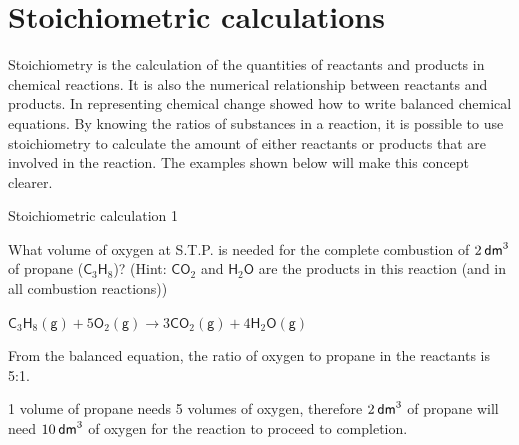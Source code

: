             \section{Stoichiometric calculations}
            \nopagebreak
      \label{m38712*id283990}Stoichiometry is the calculation of the quantities of reactants and products in chemical reactions. It is also the numerical relationship between reactants and products. In  representing chemical change showed how to write balanced chemical equations. By knowing the ratios of substances in a reaction, it is possible to use stoichiometry to calculate the amount of either reactants or products that are involved in the reaction. The examples shown below will make this concept clearer.\par 
\label{m38712*secfhsst!!!underscore!!!id1903}\vspace{.5cm}  
      \begin{wex}{Stoichiometric calculation 1 }
{

      \label{m38712*probfhsst!!!underscore!!!id1904}
      \label{m38712*id275479}What volume of oxygen at S.T.P. is needed for the complete combustion of $2\phantom{\rule{2pt}{0ex}}{\mathsf{dm}}^{3}$ of propane ($\mathsf{C}{}_{3}\mathsf{H}{}_{8}$)? (Hint: $\mathsf{CO}{}_{2}$ and $\mathsf{H}{}_{2}\mathsf{O}$ are the products in this reaction (and in all combustion reactions))\par 
      \vspace{5pt}}
{
      \label{m38712*id284189}${\mathsf{C}}_{3}{\mathsf{H}}_{8}\left(\mathsf{g}\right)+5{\mathsf{O}}_{2}\left(\mathsf{g}\right)\to 3\mathsf{C}{\mathsf{O}}_{2}\left(\mathsf{g}\right)+4{\mathsf{H}}_{2}\mathsf{O}\left(\mathsf{g}\right)$
      \par 
      \label{m38712*id284294}From the balanced equation, the ratio of oxygen to propane in the reactants is 5:1.\par 
      \label{m38712*id284304}1 volume of propane needs 5 volumes of oxygen, therefore $2\phantom{\rule{2pt}{0ex}}{\mathsf{dm}}^{3}$ of propane will need $10\phantom{\rule{2pt}{0ex}}{\mathsf{dm}}^{3}$ of oxygen for the reaction to proceed to completion.\par 
}
    \end{wex}
    \noindent
\label{m38712*secfhsst!!!underscore!!!id1972}\vspace{.5cm} 
